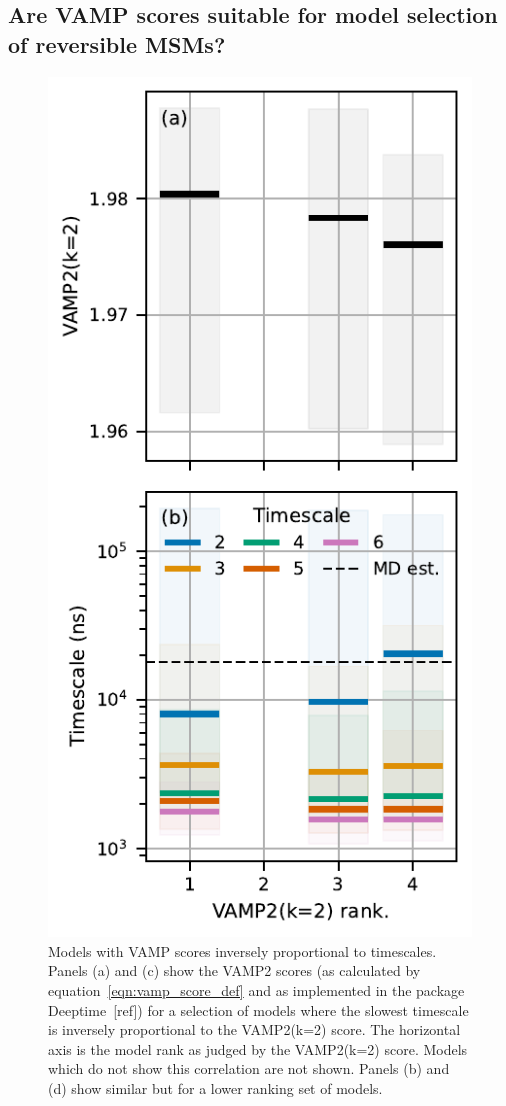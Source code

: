 \documentclass[journal=jacsat,manuscript=article]{achemso}
\begin{document}
\subsection{Are VAMP scores suitable for model selection of reversible MSMs?}
\begin{figure}
    \centering
    \includegraphics{figures/bad_vamp_ranks.pdf}
    \caption{Models with VAMP scores inversely proportional to timescales. Panels (a) and (c) show the VAMP2 scores (as calculated by equation~\ref{eqn:vamp_score_def} and as implemented in the package Deeptime~[ref]) for a selection of models where the slowest timescale is inversely proportional to the VAMP2(k=2) score. The horizontal axis is the model rank as judged by the VAMP2(k=2) score. Models which do not show this correlation are not shown.  Panels (b) and (d) show similar but for a lower ranking set of models. }
    \label{fig:bad_vamp_scores}
\end{figure}
\end{document}
